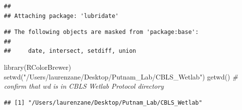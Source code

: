 \documentclass[
]{article}
\newenvironment{Shaded}{\begin{snugshade}}{\end{snugshade}}
\newcommand{\CommentTok}[1]{\textcolor[rgb]{0.56,0.35,0.01}{\textit{#1}}}
\newcommand{\FunctionTok}[1]{\textcolor[rgb]{0.00,0.00,0.00}{#1}}
\newcommand{\NormalTok}[1]{#1}
\newcommand{\OtherTok}[1]{\textcolor[rgb]{0.56,0.35,0.01}{#1}}
\newcommand{\SpecialCharTok}[1]{\textcolor[rgb]{0.00,0.00,0.00}{#1}}
\newcommand{\StringTok}[1]{\textcolor[rgb]{0.31,0.60,0.02}{#1}}
\begin{document}
\begin{verbatim}
## 
## Attaching package: 'lubridate'
\end{verbatim}

\begin{verbatim}
## The following objects are masked from 'package:base':
## 
##     date, intersect, setdiff, union
\end{verbatim}

\begin{Shaded}
\begin{Highlighting}[]
\FunctionTok{library}\NormalTok{(RColorBrewer)}
\FunctionTok{setwd}\NormalTok{(}\StringTok{"/Users/laurenzane/Desktop/Putnam\_Lab/CBLS\_Wetlab"}\NormalTok{)}
\FunctionTok{getwd}\NormalTok{() }\CommentTok{\# confirm that wd is in CBLS Wetlab Protocol directory}
\end{Highlighting}
\end{Shaded}

\begin{verbatim}
## [1] "/Users/laurenzane/Desktop/Putnam_Lab/CBLS_Wetlab"
\end{verbatim}

\begin{Shaded}
\end{Shaded}
\end{document}
